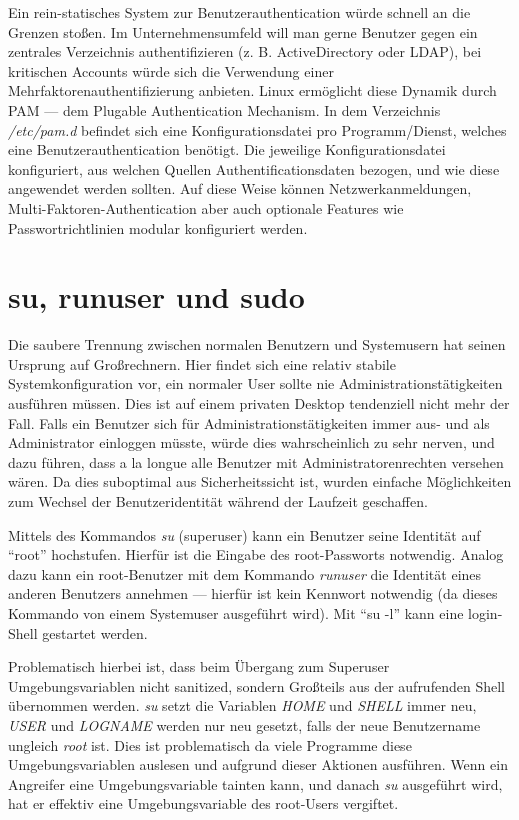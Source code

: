 Ein rein-statisches System zur Benutzerauthentication würde schnell an die Grenzen stoßen. Im Unternehmensumfeld will man gerne Benutzer gegen ein zentrales Verzeichnis authentifizieren (z. B. ActiveDirectory oder LDAP), bei kritischen Accounts würde sich die Verwendung einer Mehrfaktorenauthentifizierung anbieten. Linux ermöglicht diese Dynamik durch PAM --- dem Plugable Authentication Mechanism. In dem Verzeichnis \textit{/etc/pam.d} befindet sich eine Konfigurationsdatei pro Programm/Dienst, welches eine Benutzerauthentication benötigt. Die jeweilige Konfigurationsdatei konfiguriert, aus welchen Quellen Authentificationsdaten bezogen, und wie diese angewendet werden sollten. Auf diese Weise können Netzwerkanmeldungen, Multi-Faktoren-Authentication aber auch optionale Features wie Passwortrichtlinien modular konfiguriert werden.

\section{su, runuser und sudo}

Die saubere Trennung zwischen normalen Benutzern und Systemusern hat seinen Ursprung auf Großrechnern. Hier findet sich eine relativ stabile Systemkonfiguration vor, ein normaler User sollte nie Administrationstätigkeiten ausführen müssen. Dies ist auf einem privaten Desktop tendenziell nicht mehr der Fall. Falls ein Benutzer sich für Administrationstätigkeiten immer aus- und als Administrator einloggen müsste, würde dies wahrscheinlich zu sehr nerven, und dazu führen, dass a la longue alle Benutzer mit Administratorenrechten versehen wären. Da dies suboptimal aus Sicherheitssicht ist, wurden einfache Möglichkeiten zum Wechsel der Benutzeridentität während der Laufzeit geschaffen.

Mittels des Kommandos \textit{su} (superuser) kann ein Benutzer seine Identität auf ``root'' hochstufen. Hierfür ist die Eingabe des root-Passworts notwendig. Analog dazu kann ein root-Benutzer mit dem Kommando \textit{runuser} die Identität eines anderen Benutzers annehmen --- hierfür ist kein Kennwort notwendig (da dieses Kommando von einem Systemuser ausgeführt wird). Mit ``su -l'' kann eine login-Shell gestartet werden.

Problematisch hierbei ist, dass beim Übergang zum Superuser Umgebungsvariablen nicht sanitized, sondern Großteils aus der aufrufenden Shell übernommen werden. \textit{su} setzt die Variablen \textit{HOME} und \textit{SHELL} immer neu, \textit{USER} und \textit{LOGNAME} werden nur neu gesetzt, falls der neue Benutzername ungleich  \textit{root} ist. Dies ist problematisch da viele Programme diese Umgebungsvariablen auslesen und aufgrund dieser Aktionen ausführen. Wenn ein Angreifer eine Umgebungsvariable tainten kann, und danach \textit{su} ausgeführt wird, hat er effektiv eine Umgebungsvariable des root-Users vergiftet.

